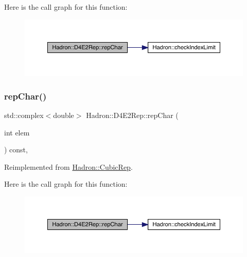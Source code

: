 Here is the call graph for this function\+:
\nopagebreak
\begin{figure}[H]
\begin{center}
\leavevmode
\includegraphics[width=350pt]{d5/da6/structHadron_1_1D4E2Rep_a5f1abc30578bd5d20e32ca5676a86c84_cgraph}
\end{center}
\end{figure}
\mbox{\label{structHadron_1_1D4E2Rep_a5f1abc30578bd5d20e32ca5676a86c84}} 
\subsubsection{\texorpdfstring{repChar()}{repChar()}\hspace{0.1cm}{\footnotesize\ttfamily [2/2]}}
{\footnotesize\ttfamily std\+::complex$<$double$>$ Hadron\+::\+D4\+E2\+Rep\+::rep\+Char (\begin{DoxyParamCaption}\item[{int}]{elem }\end{DoxyParamCaption}) const\hspace{0.3cm}{\ttfamily [inline]}, {\ttfamily [virtual]}}



Reimplemented from \mbox{\hyperlink{structHadron_1_1CubicRep_af45227106e8e715e84b0af69cd3b36f8}{Hadron\+::\+Cubic\+Rep}}.

Here is the call graph for this function\+:
\nopagebreak
\begin{figure}[H]
\begin{center}
\leavevmode
\includegraphics[width=350pt]{d5/da6/structHadron_1_1D4E2Rep_a5f1abc30578bd5d20e32ca5676a86c84_cgraph}
\end{center}
\end{figure}
\mbox{\label{structHadron_1_1D4E2Rep_ae07926c0c41e03ed930683eb4e9be5f5}} 
